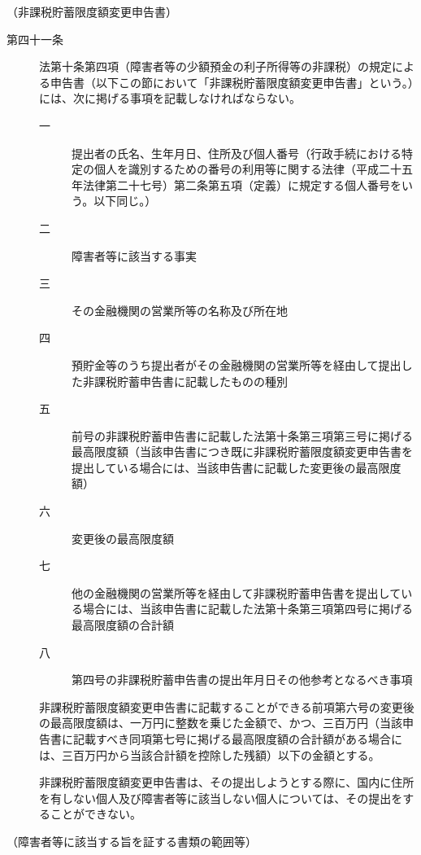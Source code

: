 \documentclass[twocolumn,a4j,10pt]{ltjtarticle}
\begin{document}
\noindent\hspace{10pt}（非課税貯蓄限度額変更申告書）
\begin{description}
\item[第四十一条]法第十条第四項（障害者等の少額預金の利子所得等の非課税）の規定による申告書（以下この節において「非課税貯蓄限度額変更申告書」という。）には、次に掲げる事項を記載しなければならない。
\begin{description}
\item[一]提出者の氏名、生年月日、住所及び個人番号（行政手続における特定の個人を識別するための番号の利用等に関する法律（平成二十五年法律第二十七号）第二条第五項（定義）に規定する個人番号をいう。以下同じ。）
\item[二]障害者等に該当する事実
\item[三]その金融機関の営業所等の名称及び所在地
\item[四]預貯金等のうち提出者がその金融機関の営業所等を経由して提出した非課税貯蓄申告書に記載したものの種別
\item[五]前号の非課税貯蓄申告書に記載した法第十条第三項第三号に掲げる最高限度額（当該申告書につき既に非課税貯蓄限度額変更申告書を提出している場合には、当該申告書に記載した変更後の最高限度額）
\item[六]変更後の最高限度額
\item[七]他の金融機関の営業所等を経由して非課税貯蓄申告書を提出している場合には、当該申告書に記載した法第十条第三項第四号に掲げる最高限度額の合計額
\item[八]第四号の非課税貯蓄申告書の提出年月日その他参考となるべき事項
\end{description}
\item[]非課税貯蓄限度額変更申告書に記載することができる前項第六号の変更後の最高限度額は、一万円に整数を乗じた金額で、かつ、三百万円（当該申告書に記載すべき同項第七号に掲げる最高限度額の合計額がある場合には、三百万円から当該合計額を控除した残額）以下の金額とする。
\item[]非課税貯蓄限度額変更申告書は、その提出しようとする際に、国内に住所を有しない個人及び障害者等に該当しない個人については、その提出をすることができない。
\end{description}
\noindent\hspace{10pt}（障害者等に該当する旨を証する書類の範囲等）
\end{document}
